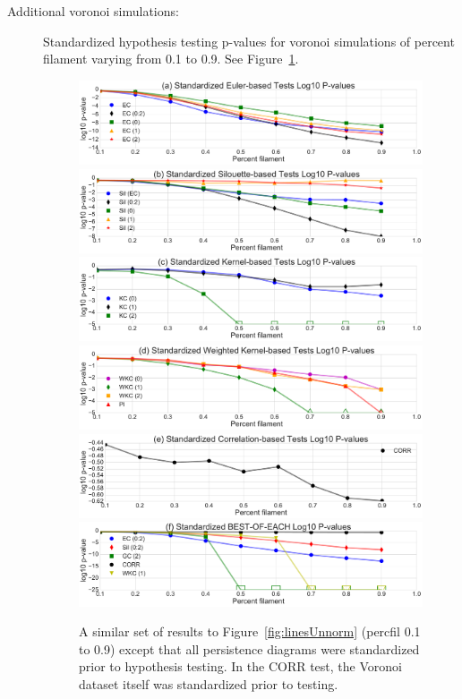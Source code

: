 \documentclass[12pt]{article}
\newcommand{\figref}[1]{Figure~\ref{#1}}
\begin{document}
\begin{description}
\item[Additional voronoi simulations:] Standardized hypothesis testing p-values for voronoi simulations of percent filament varying from 0.1 to 0.9. See \figref{fig:linesNorm}.

\begin{figure}[htp!]
  \centering
  \includegraphics[width=0.7\linewidth]{euler_lineplot_log10_norm_True.pdf}
    \includegraphics[width=0.7\linewidth]{silh_lineplot_log10_norm_True.pdf}
    \includegraphics[width=0.7\linewidth]{smooth_lineplot_log10_norm_True.pdf}
    \includegraphics[width=0.7\linewidth]{weight_lineplot_log10_norm_True.pdf}
    \includegraphics[width=0.7\linewidth]{corr_lineplot_log10_norm_True.pdf}
    \includegraphics[width=0.7\linewidth]{cross_lineplot_log10_norm_True.pdf}
    \caption{A similar set of results to \figref{fig:linesUnnorm} (percfil 0.1 to 0.9) except that all persistence diagrams were standardized prior to hypothesis testing. In the CORR test, the Voronoi dataset itself was standardized prior to testing.}
    \label{fig:linesNorm}
\end{figure}

\end{description}




\end{document}
